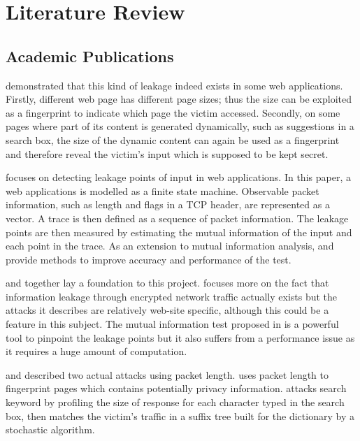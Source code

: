 \chapter{Literature Review}

\section{Academic Publications}

\cite{Web1} demonstrated that this kind of  leakage indeed exists in some web applications. Firstly, different web page has different page sizes; thus the size can be exploited as a fingerprint to indicate which page the victim accessed. Secondly, on some pages where part of its content is generated dynamically, such as suggestions in a search box, the size of the dynamic content can again be used as a fingerprint and therefore reveal the victim's input which is supposed to be kept secret.

\cite{Web2} focuses on detecting leakage points of input in web applications. In this paper, a web applications is modelled as a finite state machine. Observable packet information, such as length and flags in a TCP header, are represented as a vector. A trace is then defined as a sequence of packet information. The leakage points are then measured by estimating the mutual information of  the input and each point in the trace. As an extension to mutual information analysis, \cite{DBLP:conf/csfw/AlvimCPS12} and \cite{DBLP:conf/csfw/ChothiaG11} provide methods to improve accuracy and performance of the test.

\cite{Web1} and \cite{Web2} together lay a foundation to this project. \cite{Web1} focuses more on the fact that information leakage through encrypted network traffic actually exists but the attacks it describes are relatively web-site specific, although this could be a feature in this subject. The mutual information test proposed in \cite{Web2} is a powerful tool to pinpoint the leakage points but it also suffers from a performance issue as it requires a huge amount of computation.

\cite{Danezis_trafficanalysis} and \cite{DBLP:journals/iacr/SchaubSHCJTHGR14} described two actual attacks using packet length. \cite{Danezis_trafficanalysis} uses packet length to fingerprint pages which contains potentially privacy information. \cite{DBLP:journals/iacr/SchaubSHCJTHGR14} attacks search keyword by profiling the size of response for each character typed in the search box, then matches the victim's traffic in a suffix tree built for the dictionary by a stochastic algorithm.

